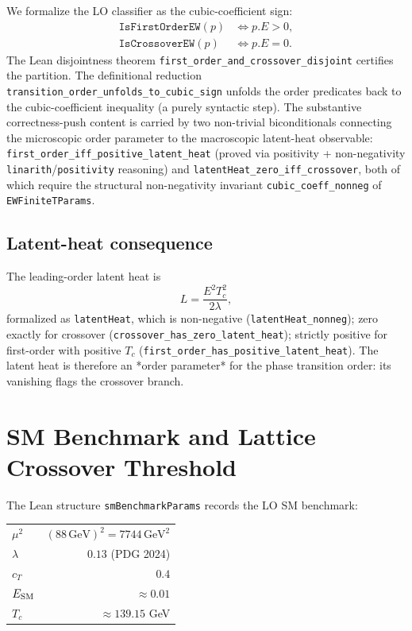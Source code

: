 \documentclass[aps,prd,twocolumn,showpacs,superscriptaddress,nofootinbib]{revtex4-2}
\newcommand{\CubicCoeff}{E}
\begin{document}
We formalize the LO classifier as the cubic-coefficient sign:
\begin{align}
\texttt{IsFirstOrderEW}(p) &\iff p.\CubicCoeff > 0,\\
\texttt{IsCrossoverEW}(p) &\iff p.\CubicCoeff = 0.
\end{align}
The Lean disjointness theorem
\texttt{first\_order\_and\_crossover\_disjoint} certifies the partition.
The definitional reduction
\texttt{transition\_order\_unfolds\_to\_cubic\_sign} unfolds the order
predicates back to the cubic-coefficient inequality (a purely
syntactic step). The substantive correctness-push content is carried
by two non-trivial biconditionals connecting the microscopic order
parameter to the macroscopic latent-heat observable:
\texttt{first\_order\_iff\_positive\_latent\_heat} (proved via
positivity + non-negativity \texttt{linarith}/\texttt{positivity}
reasoning) and \texttt{latentHeat\_zero\_iff\_crossover}, both of which
require the structural non-negativity invariant
\texttt{cubic\_coeff\_nonneg} of \texttt{EWFiniteTParams}.

\subsection{Latent-heat consequence}

The leading-order latent heat is
\begin{equation}
L = \frac{\CubicCoeff^2 T_c^2}{2 \lambda},
\end{equation}
formalized as \texttt{latentHeat}, which is non-negative
(\texttt{latentHeat\_nonneg}); zero exactly for crossover
(\texttt{crossover\_has\_zero\_latent\_heat}); strictly positive for
first-order with positive $T_c$
(\texttt{first\_order\_has\_positive\_latent\_heat}). The latent heat
is therefore an *order parameter* for the phase transition order: its
vanishing flags the crossover branch.

\section{SM Benchmark and Lattice Crossover Threshold}
\label{sec:sm-benchmark}

The Lean structure \texttt{smBenchmarkParams} records the LO SM
benchmark:
\begin{center}
\begin{tabular}{lr}
\toprule
$\mu^2$ & $(88\,\mathrm{GeV})^2 = 7744\,\mathrm{GeV}^2$ \\
$\lambda$ & $0.13$ (PDG 2024) \\
$c_T$ & $0.4$ \\
$\CubicCoeff_{\rm SM}$ & $\approx 0.01$ \\
$T_c$ & $\approx 139.15$ GeV \\
\bottomrule
\end{tabular}
\end{center}
\end{document}
